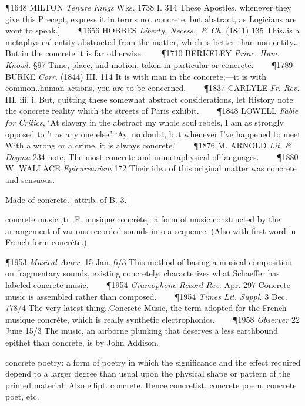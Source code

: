 \begin{description}[wide, labelwidth=!, labelindent=0pt]
\begin{myenumerate}
\P 1648 MILTON  \textit{Tenure Kings} Wks. 1738 I. 314  These Apostles, whenever they give this Precept, express it in terms not concrete, but abstract, as Logicians are wont to speak.]    
\P 1656 HOBBES  \textit{Liberty, Necess., \& Ch.} (1841) 135 This‥is a metaphysical entity abstracted from the matter, which is better than non-entity‥But in the concrete it is far otherwise.    
\P 1710 BERKELEY  \textit{Princ. Hum. Knowl.} §97 Time, place, and motion, taken in particular or concrete.    
\P 1789 BURKE  \textit{Corr.} (1844) III. 114 It is with man in the concrete;—it is with common‥human actions, you are to be concerned.    
\P 1837 CARLYLE  \textit{Fr. Rev.} III. iii. i, But, quitting these somewhat abstract considerations, let History note the concrete reality which the streets of Paris exhibit.    
\P 1848 LOWELL  \textit{Fable for Critics}, ‘At slavery in the abstract my whole soul rebels, I am as strongly opposed to 't as any one else.’ ‘Ay, no doubt, but whenever I've happened to meet With a wrong or a crime, it is always concrete.’    
\P 1876 M. ARNOLD  \textit{Lit. \& Dogma} 234 note, The most concrete and unmetaphysical of languages.    
\P 1880 W. WALLACE  \textit{Epicureanism} 172 Their idea of this original matter was concrete and sensuous.

 Made of concrete. [attrib. of B. 3.]

 concrete music [tr. F. musique concrète]: a form of music constructed by the arrangement of various recorded sounds into a sequence. (Also with first word in French form concrète.)

\P 1953 \textit{Musical  Amer.} 15 Jan. 6/3 This method of basing a musical composition on fragmentary sounds, existing concretely, characterizes what Schaeffer has labeled concrete music.    
\P 1954 \textit{Gramophone  Record Rev.} Apr. 297 Concrete music is assembled rather than composed.    
\P 1954  \textit{Times Lit. Suppl.} 3 Dec. 778/4 The very latest thing‥Concrete Music, the term adopted for the French musique concrète, which is really synthetic electrophonics.    
\P 1958 \textit{Observer}  22 June 15/3 The music, an airborne plunking that deserves a less earthbound epithet than concrète, is by John Addison.

 concrete poetry: a form of poetry in which the significance and the effect required depend to a larger degree than usual upon the physical shape or pattern of the printed material. Also ellipt. concrete. Hence concretist, concrete poem, concrete poet, etc.


\end{myenumerate}
\end{description}
